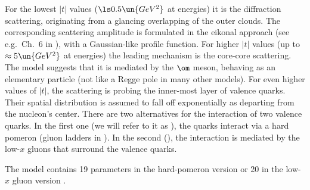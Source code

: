 For the lowest $|t|$ values ($\ls 0.5\un{GeV^2}$ at  energies) it is the diffraction scattering, originating from a glancing overlapping of the outer clouds. The corresponding scattering amplitude is formulated in the eikonal approach (see e.g.~Ch.~6 in ), with a Gaussian-like profile function. For higher $|t|$ values (up to $\approx 5\un{GeV^2}$ at  energies) the leading mechanism is the core-core scattering. The  model suggests that it is mediated by the $\rm\om$ meson, behaving as an elementary particle (not like a Regge pole in many other models). For even higher values of $|t|$, the scattering is probing the inner-most layer of valence quarks. Their spatial distribution is assumed to fall off exponentially as departing from the nucleon's center. There are two alternatives for the interaction of two valence quarks. In the first one (we will refer to it as ), the quarks interact via a hard pomeron (gluon ladders in ). In the second (), the interaction is mediated by the low-$x$ gluons that surround the valence quarks.

The model contains 19 parameters in the hard-pomeron version  or 20 in the low-$x$ gluon version .

